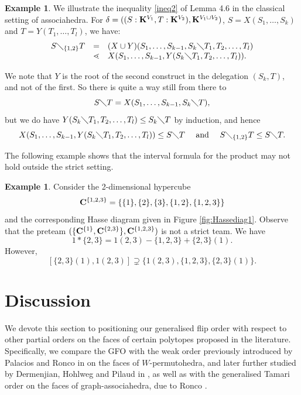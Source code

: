 \documentclass{article}
\theoremstyle{plain}
\theoremstyle{definition}
\newtheorem{example}[thm]{\sc Example}
\newcommand{\set}[1]{\{#1\}}
\newcommand{\hyper}[1]{{\bf #1}}
\begin{document}
\begin{example} We illustrate the inequality \eqref{ineq2} of Lemma 4.6 in the classical setting of associahedra. For $\delta=((S:\hyper{K}^{V_1}, T:\hyper{K}^{V_2}), \hyper{K}^{V_1\cup V_2})$, $S=X(S _1,\ldots,S_k)$ and
 $T=Y(T_1,\ldots,T_l)$, we have: 
$$\begin{array}{rcl}
S\diagdown_{\set{1,2}} T &= &(X\cup Y)(S _1,\ldots,S_{k-1},S_k\diagdown T_1,T_2,\ldots , T_l) \\
 &\lessdot& X(S _1,\ldots,S_{k-1},Y(S_k\diagdown T_1,T_2,\ldots ,T_l)).
\end{array} $$ 
 
 \noindent We note that $Y$ is the root of the second construct in the delegation $(S_k,T)$, and not of the first.
 So there is quite a way still from there to $$S\diagdown T=X(S_1,\ldots,S_{k-1},S_k\diagdown T),$$ but 
 we do have $Y(S_k\diagdown T_1,T_2,\ldots, T_l)\leq S_k\diagdown T$ by induction, 
 and
 hence $$X(S _1,\ldots,S_{k-1},Y(S_k\diagdown T_1,T_2,\ldots , T_l))\leq S\diagdown T \quad \mbox{ and } \quad S\diagdown_{\{1,2\}} T\leq S\diagdown T.$$ 
 \end{example}



 
The following example shows that the interval formula for the product may not hold outside the strict setting.
\begin{example}\label{hcf}
Consider the 2-dimensional hypercube $${\bf C}^{\{1,2,3\}}=\{\{1\},\{2\},\{3\},\{1,2\},\{1,2,3\}\}$$ and the corresponding Hasse diagram given in Figure \ref{fig:Hassediag1}. Observe that the preteam $(\{{\bf C}^{\{1\}},{\bf C}^{\{2,3\}}\},{\bf C}^{\{1,2,3\}})$ is not a strict team. We have $$1\ast \{2,3\}=1(2,3)-\{1,2,3\}+\{2,3\}(1).$$ However, $$[\{2,3\}(1),1(2,3)]\supsetneq \{1(2,3),\{1,2,3\},\{2,3\}(1)\}.$$
 

\end{example}

\section{Discussion} \label{comparison-section}
We devote this section to positioning our generalised flip order with respect to other partial orders on the faces of certain polytopes proposed in the literature.
Specifically, we compare the GFO with the weak order previously introduced by Palacios and Ronco in \cite{PalaciosRonco} on the faces of $W$-permutohedra, and later further studied by Dermenjian, Hohlweg and Pilaud in \cite{DHP-WFO}, as well as with the generalised Tamari order on the faces of graph-associahedra, due to Ronco \cite{RoncoGTO}.
\end{document}
